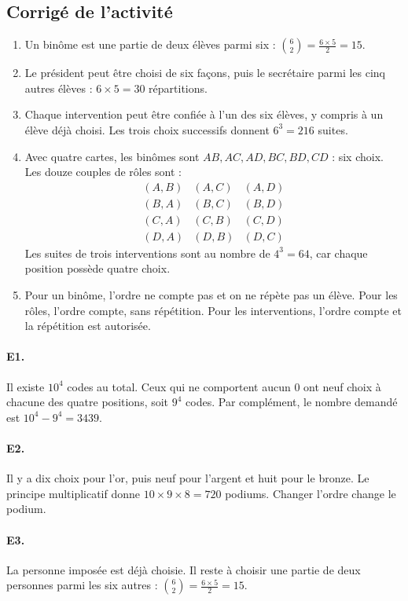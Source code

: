 \subsection{Corrigé de l'activité}\begin{enumerate}
\item Un binôme est une partie de deux élèves parmi six : $\binom{6}{2}=\frac{6\times5}{2}=15$.
\item Le président peut être choisi de six façons, puis le secrétaire parmi les cinq autres élèves : $6\times5=30$ répartitions.
\item Chaque intervention peut être confiée à l'un des six élèves, y compris à un élève déjà choisi. Les trois choix successifs donnent $6^3=216$ suites.
\item Avec quatre cartes, les binômes sont $AB,AC,AD,BC,BD,CD$ : six choix. Les douze couples de rôles sont :\[\begin{array}{lll}(A,B)&(A,C)&(A,D)\\(B,A)&(B,C)&(B,D)\\(C,A)&(C,B)&(C,D)\\(D,A)&(D,B)&(D,C)\end{array}\] Les suites de trois interventions sont au nombre de $4^3=64$, car chaque position possède quatre choix.
\item Pour un binôme, l'ordre ne compte pas et on ne répète pas un élève. Pour les rôles, l'ordre compte, sans répétition. Pour les interventions, l'ordre compte et la répétition est autorisée.
\end{enumerate}

\paragraph{E1.}Il existe $10^4$ codes au total. Ceux qui ne comportent aucun $0$ ont neuf choix à chacune des quatre positions, soit $9^4$ codes. Par complément, le nombre demandé est $10^4-9^4=3439$.

\paragraph{E2.}Il y a dix choix pour l'or, puis neuf pour l'argent et huit pour le bronze. Le principe multiplicatif donne $10\times9\times8=720$ podiums. Changer l'ordre change le podium.

\paragraph{E3.}La personne imposée est déjà choisie. Il reste à choisir une partie de deux personnes parmi les six autres : $\binom{6}{2}=\frac{6\times5}{2}=15$.

